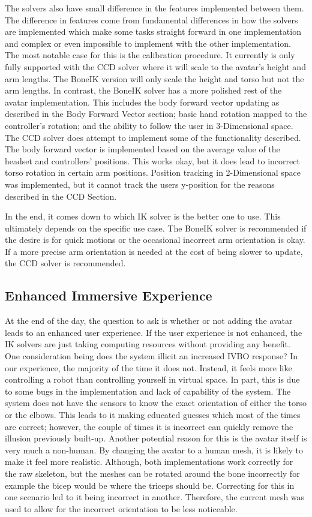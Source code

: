 \documentclass{vgtc}                          %
\begin{document}
    The solvers also have small difference in the features implemented between them. The difference in features come from fundamental differences in how the solvers are implemented which make some tasks straight forward in one implementation and complex or even impossible to implement with the other implementation. The most notable case for this is the calibration procedure. It currently is only fully supported with the CCD solver where it will scale to the avatar’s height and arm lengths. The BoneIK version will only scale the height and torso but not the arm lengths. In contrast, the BoneIK solver has a more polished rest of the avatar implementation. This includes the body forward vector updating as described in the Body Forward Vector section; basic hand rotation mapped to the controller’s rotation; and the ability to follow the user in 3-Dimensional space. The CCD solver does attempt to implement some of the functionality described. The body forward vector is implemented based on the average value of the headset and controllers’ positions. This works okay, but it does lead to incorrect torso rotation in certain arm positions. Position tracking in 2-Dimensional space was implemented, but it cannot track the users y-position for the reasons described in the CCD Section.

    In the end, it comes down to which IK solver is the better one to use. This ultimately depends on the specific use case. The BoneIK solver is recommended if the desire is for quick motions or the occasional incorrect arm orientation is okay. If a more precise arm orientation is needed at the cost of being slower to update, the CCD solver is recommended. 

\subsection{Enhanced Immersive Experience}

    At the end of the day, the question to ask is whether or not adding the avatar leads to an enhanced user experience. If the user experience is not enhanced, the IK solvers are just taking computing resources without providing any benefit.  One consideration being does the system illicit an increased IVBO response? In our experience, the majority of the time it does not. Instead, it feels more like controlling a robot than controlling yourself in virtual space. In part, this is due to some bugs in the implementation and lack of capability of the system. The system does not have the sensors to know the exact orientation of either the torso or the elbows. This leads to it making educated guesses which most of the times are correct; however, the couple of times it is incorrect can quickly remove the illusion previously built-up. Another potential reason for this is the avatar itself is very much a non-human. By changing the avatar to a human mesh, it is likely to make it feel more realistic. Although, both implementations work correctly for the raw skeleton, but the meshes can be rotated around the bone incorrectly for example the bicep would be where the triceps should be. Correcting for this in one scenario led to it being incorrect in another. Therefore, the current mesh was used to allow for the incorrect orientation to be less noticeable. 
\end{document}

